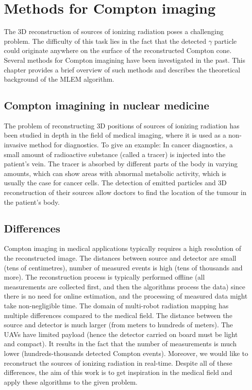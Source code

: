 \chapter{Methods for Compton imaging\label{chap:mlem_theory}}
The 3D reconstruction of sources of ionizing radiation poses a challenging problem.
The difficulty of this task lies in the fact that the detected $\gamma$ particle could originate anywhere on the surface of the reconstructed Compton cone.
Several methods for Compton imagining have been investigated in the past.
This chapter provides a brief overview of such methods and describes the theoretical background of the \ac{MLEM} algorithm.

\section{Compton imagining in nuclear medicine}
The problem of reconstructing 3D positions of sources of ionizing radiation has been studied in depth in the field of medical imaging, where it is used as a non-invasive method for diagnostics.
To give an example:
In cancer diagnostics, a small amount of radioactive substance (called a tracer) is injected into the patient's vein.
The tracer is absorbed by different parts of the body in varying amounts, which can show areas with abnormal metabolic activity, which is usually the case for cancer cells.
The detection of emitted particles and 3D reconstruction of their sources allow doctors to find the location of the tumour in the patient's body.

\section{Differences}
Compton imaging in medical applications typically requires a high resolution of the reconstructed image.
The distances between source and detector are small (tens of centimetres), number of measured events is high (tens of thousands and more).
The reconstruction process is typically performed offline (all measurements are collected first, and then the algorithms process the data) since there is no need for online estimation, and the processing of measured data might take non-negligible time.
The domain of multi-robot radiation mapping has multiple differences compared to the medical field.
The distance between the source and detector is much larger (from meters to hundreds of meters).
The \ac{UAV}s have limited payload (hence the detector carried on board must be light and compact).
It results in the fact that the number of measurements is much lower (hundreds-thousands detected Compton events).
Moreover, we would like to reconstruct the sources of ionizing radiation in real-time.
Despite all of these differences, the aim of this work is to get inspiration in the medical field and apply these algorithms to the given problem.

